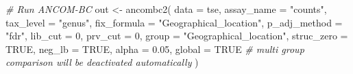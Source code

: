 \documentclass[
]{book}
\newenvironment{Shaded}{\begin{snugshade}}{\end{snugshade}}
\newcommand{\AttributeTok}[1]{\textcolor[rgb]{0.77,0.63,0.00}{#1}}
\newcommand{\CommentTok}[1]{\textcolor[rgb]{0.56,0.35,0.01}{\textit{#1}}}
\newcommand{\ConstantTok}[1]{\textcolor[rgb]{0.00,0.00,0.00}{#1}}
\newcommand{\DecValTok}[1]{\textcolor[rgb]{0.00,0.00,0.81}{#1}}
\newcommand{\FloatTok}[1]{\textcolor[rgb]{0.00,0.00,0.81}{#1}}
\newcommand{\FunctionTok}[1]{\textcolor[rgb]{0.00,0.00,0.00}{#1}}
\newcommand{\NormalTok}[1]{#1}
\newcommand{\OtherTok}[1]{\textcolor[rgb]{0.56,0.35,0.01}{#1}}
\newcommand{\SpecialCharTok}[1]{\textcolor[rgb]{0.00,0.00,0.00}{#1}}
\newcommand{\StringTok}[1]{\textcolor[rgb]{0.31,0.60,0.02}{#1}}
\begin{document}
\begin{Shaded}
\begin{Highlighting}[]
\CommentTok{\# Run ANCOM{-}BC }
\NormalTok{out }\OtherTok{\textless{}{-}} \FunctionTok{ancombc2}\NormalTok{(}
  \AttributeTok{data =}\NormalTok{ tse,}
  \AttributeTok{assay\_name =} \StringTok{"counts"}\NormalTok{, }
  \AttributeTok{tax\_level =} \StringTok{"genus"}\NormalTok{, }
  \AttributeTok{fix\_formula =} \StringTok{"Geographical\_location"}\NormalTok{, }
  \AttributeTok{p\_adj\_method =} \StringTok{"fdr"}\NormalTok{, }
  \AttributeTok{lib\_cut =} \DecValTok{0}\NormalTok{,}
  \AttributeTok{prv\_cut =} \DecValTok{0}\NormalTok{,}
  \AttributeTok{group =} \StringTok{"Geographical\_location"}\NormalTok{, }
  \AttributeTok{struc\_zero =} \ConstantTok{TRUE}\NormalTok{, }
  \AttributeTok{neg\_lb =} \ConstantTok{TRUE}\NormalTok{,}
  \AttributeTok{alpha =} \FloatTok{0.05}\NormalTok{, }
  \AttributeTok{global =} \ConstantTok{TRUE} \CommentTok{\# multi group comparison will be deactivated automatically }
\NormalTok{)}
\end{Highlighting}
\end{Shaded}

\begin{Shaded}
\end{Shaded}

\begin{Shaded}
\end{Shaded}
\end{document}
